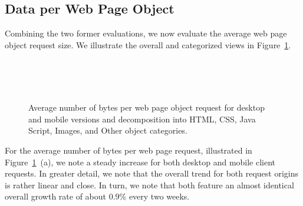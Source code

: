 \documentclass[onecolumn,12pt]{IEEEtran}
\begin{document}
\subsection{Data per Web Page Object}
Combining the two former evaluations, we now evaluate the average web page object request size.
We illustrate the overall and categorized views in Figure~\ref{fig:relative}.
\begin{figure}
	\centering
	\\
	\\
	\\
	\caption{Average number of bytes per web page object request for desktop and mobile versions and decomposition into  HTML, CSS, Java Script, Images, and Other object categories.\label{fig:relative}}
\end{figure}
For the average number of bytes per web page request, illustrated in Figure~\ref{fig:relative}~(a), we note a steady increase for both desktop and mobile client requests. 
In greater detail, we note that the overall trend for both request origins is rather linear and close.
In turn, we note that both feature an almost identical overall growth rate of about 0.9\% every two weeks.
\end{document}
